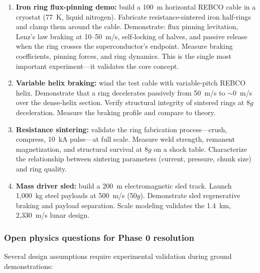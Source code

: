 \documentclass[12pt,letterpaper]{article}
\begin{document}
\begin{enumerate}[label=(\roman*)]
\item \textbf{Iron ring flux-pinning demo:} build a 100~m horizontal REBCO cable in a cryostat (77~K, liquid nitrogen). Fabricate resistance-sintered iron half-rings and clamp them around the cable. Demonstrate: flux pinning levitation, Lenz's law braking at 10--50~m/s, self-locking of halves, and passive release when the ring crosses the superconductor's endpoint. Measure braking coefficients, pinning forces, and ring dynamics. This is the single most important experiment---it validates the core concept.

\item \textbf{Variable helix braking:} wind the test cable with variable-pitch REBCO helix. Demonstrate that a ring decelerates passively from 50~m/s to ${\sim}$0~m/s over the dense-helix section. Verify structural integrity of sintered rings at 8$g$ deceleration. Measure the braking profile and compare to theory.

\item \textbf{Resistance sintering:} validate the ring fabrication process---crush, compress, 10~kA pulse---at full scale. Measure weld strength, remanent magnetization, and structural survival at 8$g$ on a shock table. Characterize the relationship between sintering parameters (current, pressure, chunk size) and ring quality.

\item \textbf{Mass driver sled:} build a 200~m electromagnetic sled track. Launch 1,000~kg steel payloads at 500~m/s (50$g$). Demonstrate sled regenerative braking and payload separation. Scale modeling validates the 1.4~km, 2,330~m/s lunar design.
\end{enumerate}

\subsubsection{Open physics questions for Phase 0 resolution}

Several design assumptions require experimental validation during ground demonstrations:
\end{document}
